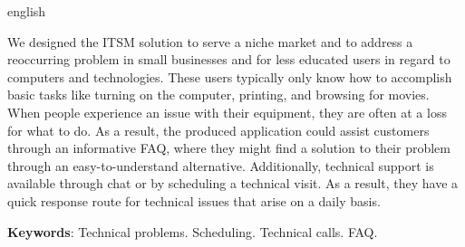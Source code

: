 \begin{resumo}[Abstract]
 \begin{otherlanguage*}{english}

   We designed the ITSM solution to serve a niche market and to address a reoccurring problem in small businesses and for less educated users in regard to computers and technologies. These users typically only know how to accomplish basic tasks like turning on the computer, printing, and browsing for movies. When people experience an issue with their equipment, they are often at a loss for what to do. As a result, the produced application could assist customers through an informative FAQ, where they might find a solution to their problem through an easy-to-understand alternative. Additionally, technical support is available through chat or by scheduling a technical visit. As a result, they have a quick response route for technical issues that arise on a daily basis.



   \vspace{\onelineskip}

   \noindent 
   \textbf{Keywords}: Technical problems. Scheduling. Technical calls. FAQ.
 \end{otherlanguage*}
\end{resumo}